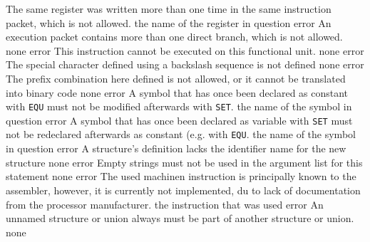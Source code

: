 \documentclass[12pt,twoside]{report}
\begin{document}
\begin{description}
               {The same register was written more than one time in the
                same instruction packet, which is not allowed.}
               {the name of the register in question}
               {error}
               {An execution packet contains more than one direct branch,
                which is not allowed.}
               {none}
               {error}
               {This instruction cannot be executed on this functional
                unit.}
               {none}
               {error}
               {The special character defined using a backslash sequence
                is not defined}
               {none}
               {error}
               {The prefix combination here defined is not allowed, or it
                cannot be translated into binary code}
               {none}
               {error}
               {A symbol that has once been declared as constant with
                {\tt EQU} must not be modified afterwards with {\tt SET}.}
               {the name of the symbol in question}
               {error}
               {A symbol that has once been declared as variable with
                {\tt SET} must not be redeclared afterwards as constant
                (e.g. with {\tt EQU}.}
               {the name of the symbol in question}
               {error}
               {A structure's definition lacks the identifier name for the
                new structure}
               {none}
               {error}
               {Empty strings must not be used in the argument list for
                this statement}
               {none}
               {error}
               {The used machinen instruction is principally known
                to the assembler, however, it is currently not
                implemented, du to lack of documentation from the
                processor manufacturer.}
               {the instruction that was used}
               {error}
               {An unnamed structure or union always must be part
                of another structure or union.}
               {none}

\end{description}
\end{document}
